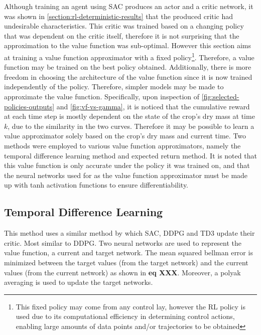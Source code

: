 Although training an agent using SAC produces an actor and a critic network, it was shown in \autoref{section:rl-deterministic-results} that the produced critic had undesirable characteristics.
This critic was trained based on a changing policy that was dependent on the critic itself, therefore it is not surprising that the approximation to the value function was sub-optimal. However this section aims at training a value function approximator with a fixed policy\footnote{This fixed policy may come from any control lay, however the RL policy is used due to its computational efficiency in determining control actions, enabling large amounts of data points and/or trajectories to be obtained}. Therefore, a value function may be trained on the best policy obtained. Additionally, there is more freedom in choosing the architecture of the value function since it is now trained independently of the policy. Therefore, simpler models may be made to approximate the value function. Specifically, upon inspection of \autoref{fig:selected-policies-outputs} and \autoref{fig:vf-vs-gamma}, it is noticed that the cumulative reward at each time step is mostly dependent on the state of the crop's dry mass at time $k$, due to the similarity in the two curves. Therefore it may be possible to learn a value approximator solely based on the crop's dry mass and current time. Two methods were employed to various value function approximators, namely the temporal difference learning method and expected return method. It is noted that this value function is only accurate under the policy it was trained on, and that the neural networks used for as the value function approximator must be made up with tanh activation functions to ensure differentiability. 



\subsection{Temporal Difference Learning}
\label{ssection:td-learning}
This method uses a similar method by which SAC, DDPG and TD3 update their critic. Most similar to DDPG. Two neural networks are used to represent the value function, a current and target network. The mean squared bellman error is minimized between the target values (from the target network) and the current values (from the current network) as shown in \textbf{eq XXX}. Moreover, a polyak averaging is used to update the target networks. 

